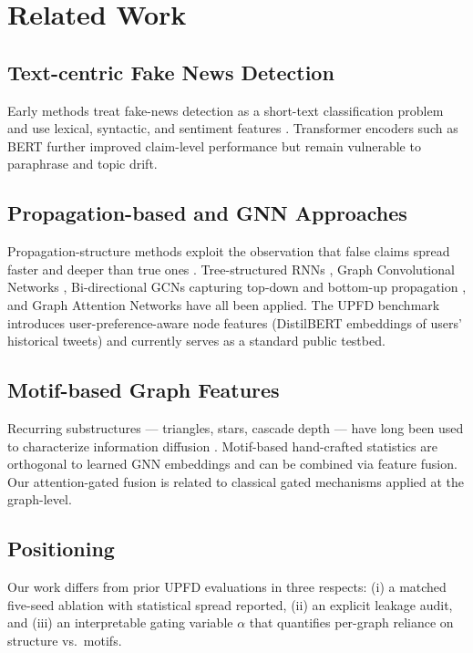 \documentclass[conference]{IEEEtran}
\begin{document}
\section{Related Work}

\subsection{Text-centric Fake News Detection}
Early methods treat fake-news detection as a short-text classification problem and use lexical, syntactic, and sentiment features \cite{shu2017survey}. Transformer encoders such as BERT \cite{devlin2019bert} further improved claim-level performance but remain vulnerable to paraphrase and topic drift.

\subsection{Propagation-based and GNN Approaches}
Propagation-structure methods exploit the observation that false claims spread faster and deeper than true ones \cite{vosoughi2018spread}. Tree-structured RNNs \cite{ma2018rvnn}, Graph Convolutional Networks \cite{monti2019fakegcn}, Bi-directional GCNs capturing top-down and bottom-up propagation \cite{bian2020bigcn}, and Graph Attention Networks \cite{velickovic2018gat} have all been applied. The UPFD benchmark \cite{dou2021upfd} introduces user-preference-aware node features (DistilBERT embeddings of users' historical tweets) and currently serves as a standard public testbed.

\subsection{Motif-based Graph Features}
Recurring substructures --- triangles, stars, cascade depth --- have long been used to characterize information diffusion \cite{milo2002motifs}. Motif-based hand-crafted statistics are orthogonal to learned GNN embeddings and can be combined via feature fusion. Our attention-gated fusion is related to classical gated mechanisms \cite{cho2014gru} applied at the graph-level.

\subsection{Positioning}
Our work differs from prior UPFD evaluations in three respects: (i) a matched five-seed ablation with statistical spread reported, (ii) an explicit leakage audit, and (iii) an interpretable gating variable $\alpha$ that quantifies per-graph reliance on structure vs.\ motifs.
\end{document}
